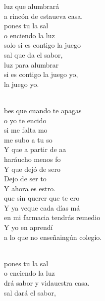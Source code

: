 \documentclass[12pt]{article}
\begin{document}
\begin{multicols*}{2}
\begin{cancion}
\begin{chorus}
	luz que alumbrará\\
	a rincón de estaueva casa.\\
	 pones tu la sal \\
	o enciendo la luz\\
	 solo si es contigo  la juego\\
	 sal que da el sabor, \\
	luz para alumbrar\\
	 si es contigo  la juego yo,\\
	 la juego yo.\\
	\end{chorus}%
	\jump\\
	bes que cuando te apagas \\
	o yo te encido\\
	 si me falta mo \\
	me subo a tu so\\
	Y  que a partir de aa \\
	haráucho menos fo \\
	Y  que dejó de sero \\
	Dejo de ser to\\
	Y ahora es estro.\\
\jump
	 que sin querer que te ero\\
	Y ya veque cada días má\\
	 en mi farmacia tendrás remedio\\
	Y yo en  aprendí \\
	a lo que no enseñaingún colegio.\\\jump\\
	\begin{chorus}%
	 pones tu la sal \\
	o enciendo la luz\\
	drá sabor y vidauestra casa.\\
	 sal dará el sabor, \\

\end{chorus}
\end{cancion}
\end{multicols*}
\end{document}
